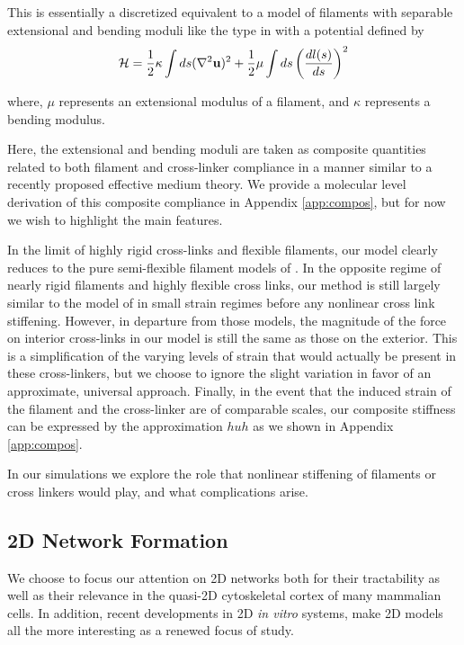 \documentclass[pre,reprint]{revtex4-1}
\begin{document}
This is essentially a discretized equivalent to a model of filaments with separable extensional and bending moduli like the type in \cite{theo_hlm} with a potential defined by
\begin{equation}
{\cal H} =\frac{1}{2}\kappa \int ds(\nabla^2\mathbf{u})^2 + \frac{1}{2}\mu \int ds \left ( \frac{dl(s) }{ds} \right )^2
\end{equation}

where, $\mu$ represents an extensional modulus of a filament, and $\kappa$ represents a bending modulus.   

Here, the extensional and bending moduli are taken as composite quantities related to both filament and cross-linker compliance in a manner similar to a recently proposed effective medium theory\cite{theo_crosslinknonlinear}.  We provide a molecular level derivation of this composite compliance in Appendix \ref{app:compos}, but for now we wish to highlight the main features.  

In the limit of highly rigid cross-links and flexible filaments, our model clearly reduces to the pure semi-flexible filament models of \cite{theo_hlm,theo_hlm2}.  In the opposite regime of nearly rigid filaments and highly flexible cross links, our method is still largely similar to the model of \cite{theo_crosslinknonlinear} in small strain regimes before any nonlinear cross link stiffening.  However, in departure from those models, the magnitude of the force on interior cross-links in our model is still the same as those on the exterior.  This is a simplification of the varying levels of strain that would actually be present in these cross-linkers, but we choose to ignore the slight variation in favor of an approximate, universal approach.  Finally, in the event that the induced strain of the filament and the cross-linker are of comparable scales, our composite stiffness can be expressed by the approximation $huh$ as we shown in Appendix \ref{app:compos}.

In our simulations we explore the role that nonlinear stiffening of filaments or cross linkers would play, and what complications arise.

\subsection{2D Network Formation}

We choose to focus our attention on 2D networks both for their tractability as well as their relevance in the quasi-2D cytoskeletal cortex of many mammalian cells\cite{cellmech_flows}.  In addition, recent developments in 2D {\em in vitro} systems\cite{rheo_2D1,rheo_2D2}, make 2D models all the more interesting as a renewed focus of study.
\end{document}
